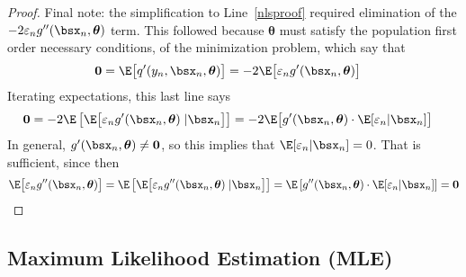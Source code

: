 \documentclass[12pt]{article}
\theoremstyle{plain}
\theoremstyle{definition}
\theoremstyle{remark}
\newcommand{\bstheta}{\boldsymbol{\theta}}
\renewcommand{\bso}{\boldsymbol{0}}
\begin{document}
\begin{proof}
Final note: the simplification to Line~\ref{nlsproof} required
elimination of the $-2\varepsilon_ng''(\bsx_n,\bstheta)$ term. This
followed because $\bstheta$ must satisfy the population first order
necessary conditions, of the minimization problem, which say that
\begin{align*}
  \bso =
  \E\big[q'(y_n,\bsx_n,\bstheta)\big]
  &=
  -2\E\big[\varepsilon_ng'(\bsx_n,\bstheta)\big]
\end{align*}
Iterating expectations, this last line says
\begin{align*}
  \bso &=
  -2\E\left[
    \E\big[\varepsilon_ng'(\bsx_n,\bstheta)\;|\bsx_n\big]
  \right]
  =
  -2\E\big[
    g'(\bsx_n,\bstheta)\cdot \E[\varepsilon_n|\bsx_n]
  \big]
\end{align*}
In general, $g'(\bsx_n,\bstheta)\neq \bso$, so this implies that
$\E[\varepsilon_n|\bsx_n]=0$. That is sufficient, since then
\begin{align*}
  \E\big[
  \varepsilon_n
  g''(\bsx_n,\bstheta)
  \big]
  =
  \E\left[
  \E\big[
  \varepsilon_n
  g''(\bsx_n,\bstheta)
  \;|\bsx_n
  \big]
  \right]
  =
  \E\left[
  g''(\bsx_n,\bstheta)
  \cdot
  \E[ \varepsilon_n |\bsx_n ]
  \right]
  =\bso
\end{align*}
\end{proof}


\clearpage
\subsection{Maximum Likelihood Estimation (MLE)}
\end{document}
